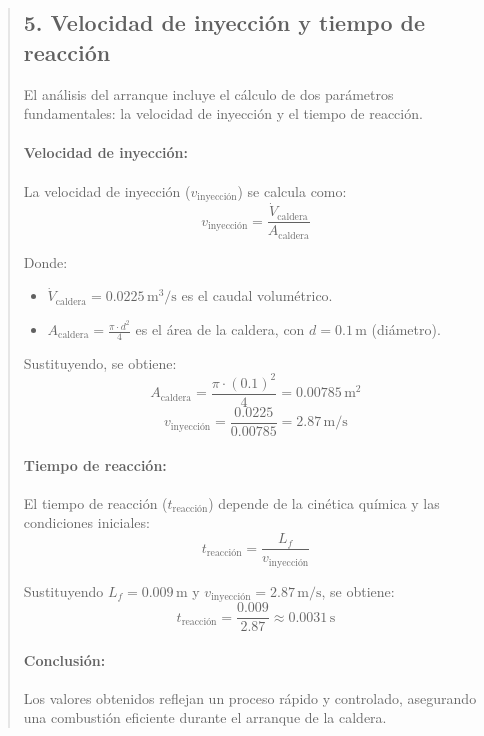 \documentclass[11pt, a4paper]{article}
\begin{document}
\begin{quote}
\begin{center}
\begin{adjustwidth}{-1.7cm}{-1cm}
\subsection*{5. Velocidad de inyección y tiempo de reacción}

El análisis del arranque incluye el cálculo de dos parámetros fundamentales: la velocidad de inyección y el tiempo de reacción.

\paragraph{Velocidad de inyección:}
La velocidad de inyección (\(v_{\text{inyección}}\)) se calcula como:
\[
v_{\text{inyección}} = \frac{\dot{V}_{\text{caldera}}}{A_{\text{caldera}}}
\]

Donde:
\begin{itemize}
    \item \(\dot{V}_{\text{caldera}} = 0.0225 \, \text{m}^3/\text{s}\) es el caudal volumétrico.
    \item \(A_{\text{caldera}} = \frac{\pi \cdot d^2}{4}\) es el área de la caldera, con \(d = 0.1 \, \text{m}\) (diámetro).
\end{itemize}

Sustituyendo, se obtiene:
\[
A_{\text{caldera}} = \frac{\pi \cdot (0.1)^2}{4} = 0.00785 \, \text{m}^2
\]
\[
v_{\text{inyección}} = \frac{0.0225}{0.00785} = 2.87 \, \text{m/s}
\]

\paragraph{Tiempo de reacción:}
El tiempo de reacción (\(t_{\text{reacción}}\)) depende de la cinética química y las condiciones iniciales:
\[
t_{\text{reacción}} = \frac{L_f}{v_{\text{inyección}}}
\]

Sustituyendo \(L_f = 0.009 \, \text{m}\) y \(v_{\text{inyección}} = 2.87 \, \text{m/s}\), se obtiene:
\[
t_{\text{reacción}} = \frac{0.009}{2.87} \approx 0.0031 \, \text{s}
\]

\paragraph{Conclusión:}
Los valores obtenidos reflejan un proceso rápido y controlado, asegurando una combustión eficiente durante el arranque de la caldera.



\vspace*{1cm}


\end{adjustwidth}
\end{center}
\end{quote}
\end{document}
